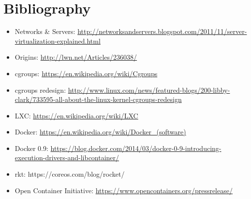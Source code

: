 \documentclass{beamer}
\begin{document}
\section{Bibliography}
\begin{frame}
\begingroup
\fontsize{6pt}{8pt}\selectfont
\begin{itemize}
\item Networks \& Servers: \url{http://networksandservers.blogspot.com/2011/11/server-virtualization-explained.html}
\item Origins: \url{http://lwn.net/Articles/236038/}
\item cgroups: \url{https://en.wikipedia.org/wiki/Cgroups}
\item cgroups redesign: \url{http://www.linux.com/news/featured-blogs/200-libby-clark/733595-all-about-the-linux-kernel-cgroups-redesign}
\item LXC: \url{https://en.wikipedia.org/wiki/LXC}
\item Docker: \url{https://en.wikipedia.org/wiki/Docker_(software)}
\item Docker 0.9: \url{https://blog.docker.com/2014/03/docker-0-9-introducing-execution-drivers-and-libcontainer/}
\item rkt: https://coreos.com/blog/rocket/
\item Open Container Initiative: \url{https://www.opencontainers.org/pressrelease/}
\end{itemize}
\endgroup
\end{frame}
\end{document}
